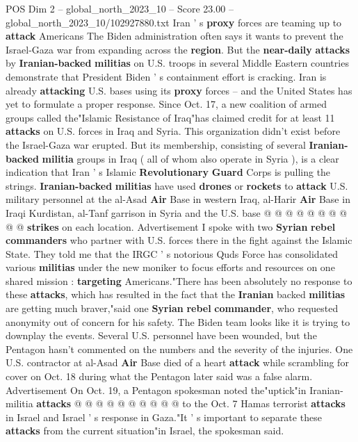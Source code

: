 \begin{textsample}{POS Dim 2 – global\_north\_2023\_10 – Score 23.00 – global\_north\_2023\_10/102927880.txt}  \label{ex:f2_pos_146}
Iran ' s \textbf{proxy} forces are teaming up to \textbf{attack} Americans The Biden administration often says it wants to prevent the Israel-Gaza war from expanding across the \textbf{region}.
But the \textbf{near-daily} \textbf{attacks} by \textbf{Iranian-backed} \textbf{militias} on U.S. troops in several Middle Eastern countries demonstrate that President Biden ' s containment effort is cracking.
Iran is already \textbf{attacking} U.S. bases using its \textbf{proxy} forces -- and the United States has yet to formulate a proper response.
Since Oct. 17, a new coalition of armed groups called the"Islamic Resistance of Iraq"has claimed credit for at least 11 \textbf{attacks} on U.S. forces in Iraq and Syria.
This organization didn't exist before the Israel-Gaza war erupted.
But its membership, consisting of several \textbf{Iranian-backed} \textbf{militia} groups in Iraq ( all of whom also operate in Syria ), is a clear indication that Iran ' s Islamic \textbf{Revolutionary} \textbf{Guard} Corps is pulling the strings. \textbf{Iranian-backed} \textbf{militias} have used \textbf{drones} or \textbf{rockets} to \textbf{attack} U.S. military personnel at the al-Asad \textbf{Air} Base in western Iraq, al-Harir \textbf{Air} Base in Iraqi Kurdistan, al-Tanf garrison in Syria and the U.S. base @ @ @ @ @ @ @ @ @ @ \textbf{strikes} on each location.
Advertisement I spoke with two \textbf{Syrian} \textbf{rebel} \textbf{commanders} who partner with U.S. forces there in the fight against the Islamic State.
They told me that the IRGC ' s notorious Quds Force has consolidated various \textbf{militias} under the new moniker to focus efforts and resources on one shared mission : \textbf{targeting} Americans."There has been absolutely no response to these \textbf{attacks}, which has resulted in the fact that the \textbf{Iranian} backed \textbf{militias} are getting much braver,"said one \textbf{Syrian} \textbf{rebel} \textbf{commander}, who requested anonymity out of concern for his safety.
The Biden team looks like it is trying to downplay the events.
Several U.S. personnel have been wounded, but the Pentagon hasn't commented on the numbers and the severity of the injuries.
One U.S. contractor at al-Asad \textbf{Air} Base died of a heart \textbf{attack} while scrambling for cover on Oct. 18 during what the Pentagon later said was a false alarm.
Advertisement On Oct. 19, a Pentagon spokesman noted the"uptick"in Iranian-militia \textbf{attacks} @ @ @ @ @ @ @ @ @ @ to the Oct. 7 Hamas terrorist \textbf{attacks} in Israel and Israel ' s response in Gaza."It ' s important to separate these \textbf{attacks} from the current situation"in Israel, the spokesman said.

\end{textsample}
